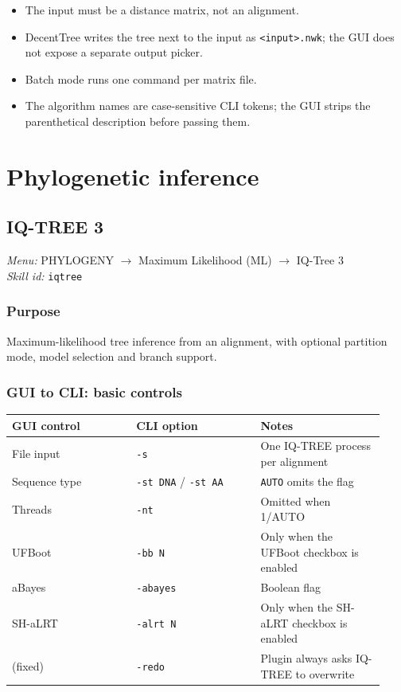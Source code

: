 \documentclass[11pt]{report}
\begin{document}
\begin{itemize}
  \item The input must be a distance matrix, not an alignment.
  \item DecentTree writes the tree next to the input as \texttt{<input>.\allowbreak nwk}; the GUI does not expose a separate output picker.
  \item Batch mode runs one command per matrix file.
  \item The algorithm names are case-sensitive CLI tokens; the GUI strips the parenthetical description before passing them.
\end{itemize}


\chapter{Phylogenetic inference}
\section{IQ-TREE 3}
\noindent\textit{Menu:} PHYLOGENY $\rightarrow$ Maximum Likelihood (ML) $\rightarrow$ IQ-Tree 3\\
\noindent\textit{Skill id:} \texttt{iqtree}

\subsection{Purpose}

Maximum-likelihood tree inference from an alignment, with optional partition mode, model selection and branch support.

\subsection{GUI to CLI: basic controls}

{\footnotesize
\begin{longtable}{@{}>{\raggedright\arraybackslash}p{0.31\linewidth}>{\raggedright\arraybackslash}p{0.31\linewidth}>{\raggedright\arraybackslash}p{0.31\linewidth}@{}}
\toprule
GUI control & CLI option & Notes \\
\midrule
\endhead
File input & \texttt{-s} & One IQ-TREE process per alignment \\
Sequence type & \texttt{-st DNA} / \texttt{-st AA} & \texttt{AUTO} omits the flag \\
Threads & \texttt{-nt} & Omitted when 1/AUTO \\
UFBoot & \texttt{-bb N} & Only when the UFBoot checkbox is enabled \\
aBayes & \texttt{-abayes} & Boolean flag \\
SH-aLRT & \texttt{-alrt N} & Only when the SH-aLRT checkbox is enabled \\
(fixed) & \texttt{-redo} & Plugin always asks IQ-TREE to overwrite \\
\bottomrule
\end{longtable}
}
\end{document}
